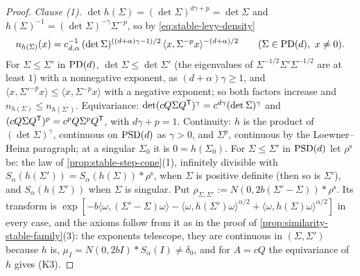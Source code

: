 \begin{proof}
\emph{Clause (1).} $\det h(\Sigma) = (\det\Sigma)^{d\gamma + p} = \det\Sigma$ and
$h(\Sigma)^{-1} = (\det\Sigma)^{-\gamma}\Sigma^{-p}$, so by \ref{eq:stable-levy-density}
\[
  n_{h(\Sigma)}(x) = c_{d,\alpha}^{-1}\,(\det\Sigma)^{((d+\alpha)\gamma - 1)/2}\,\langle x,\Sigma^{-p}x\rangle^{-(d+\alpha)/2}
  \qquad (\Sigma \in \mathrm{PD}(d),\ x \ne 0).
\]
For $\Sigma \le \Sigma'$ in $\mathrm{PD}(d)$, $\det\Sigma \le \det\Sigma'$ (the eigenvalues of
$\Sigma^{-1/2}\Sigma'\Sigma^{-1/2}$ are at least $1$) with a nonnegative exponent, as
$(d+\alpha)\gamma \ge 1$, and $\langle x,\Sigma'^{-p}x\rangle \le \langle x,\Sigma^{-p}x\rangle$ with a negative
exponent; so both factors increase and $n_{h(\Sigma)} \le n_{h(\Sigma')}$. Equivariance:
$\det(cQ\Sigma Q^{\mathsf{T}})^\gamma = c^{d\gamma}(\det\Sigma)^\gamma$ and $(cQ\Sigma Q^{\mathsf{T}})^p = c^pQ\Sigma^pQ^{\mathsf{T}}$, with
$d\gamma + p = 1$. Continuity: $h$ is the product of $(\det\Sigma)^\gamma$, continuous on $\mathrm{PSD}(d)$ as $\gamma > 0$,
and $\Sigma^p$, continuous by the Loewner--Heinz paragraph; at a singular $\Sigma_0$ it is
$0 = h(\Sigma_0)$. For $\Sigma \le \Sigma'$ in
$\mathrm{PSD}(d)$ let $\rho^{\mathrm s}$ be: the law of \ref{prop:stable-step-cone}(1), infinitely divisible with
$S_\alpha(h(\Sigma')) = S_\alpha(h(\Sigma)) * \rho^{\mathrm s}$, when $\Sigma$ is positive definite (then so is
$\Sigma'$), and $S_\alpha(h(\Sigma'))$ when $\Sigma$ is singular. Put
$\rho_{\Sigma,\Sigma'} := N(0,2b(\Sigma' - \Sigma)) * \rho^{\mathrm s}$. Its transform is
$\exp[-b\langle\omega,(\Sigma' - \Sigma)\omega\rangle - \langle\omega,h(\Sigma')\omega\rangle^{\alpha/2} +
\langle\omega,h(\Sigma)\omega\rangle^{\alpha/2}]$ in every case, and the axioms follow from it as in the
proof of \ref{prop:similarity-stable-family}(3): the exponents telescope, they are continuous in
$(\Sigma,\Sigma')$ because $h$ is, $\mu_I = N(0,2bI) * S_\alpha(I) \ne \delta_0$, and for $A = cQ$ the
equivariance of $h$ gives (K3).


\end{proof}
